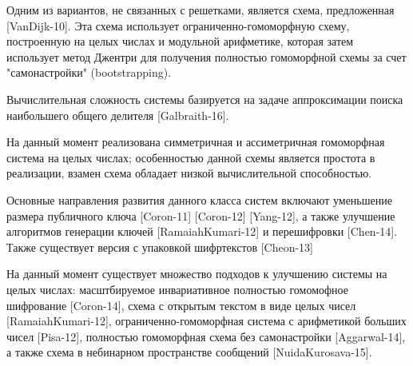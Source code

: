 Одним из вариантов, не связанных с решетками, является схема, предложенная [VanDijk-10]. Эта схема использует ограниченно-гомоморфную схему, построенную на целых числах и модульной арифметике, которая затем использует метод Джентри для получения полностью гомоморфной схемы за счет "самонастройки" (bootstrapping).\par
Вычислительная сложность системы базируется на задаче аппроксимации поиска наибольшего общего делителя [Galbraith-16].\par
На данный момент реализована симметричная и ассиметричная гомоморфная система на целых числах; особенностью данной схемы является простота в реализации, взамен схема обладает низкой вычислительной способностью.\par
Основные направления развития данного класса систем включают уменьшение размера публичного ключа [Coron-11] [Coron-12] [Yang-12], а также улучшение алгоритмов генерации ключей [RamaiahKumari-12] и перешифровки [Chen-14]. Также существует версия с упаковкой шифртекстов [Cheon-13]\par
На данный момент существует множество подходов к улучшению системы на целых числах: масштбируемое инвариативное полностью гомомофное шифрование [Coron-14], схема с открытым текстом в виде целых чисел [RamaiahKumari-12], ограниченно-гомоморфная система с арифметикой больших чисел [Pisa-12], полностью гомоморфная схема без самонастройки [Aggarwal-14], а также схема в небинарном пространстве сообщений [NuidaKurosava-15].
